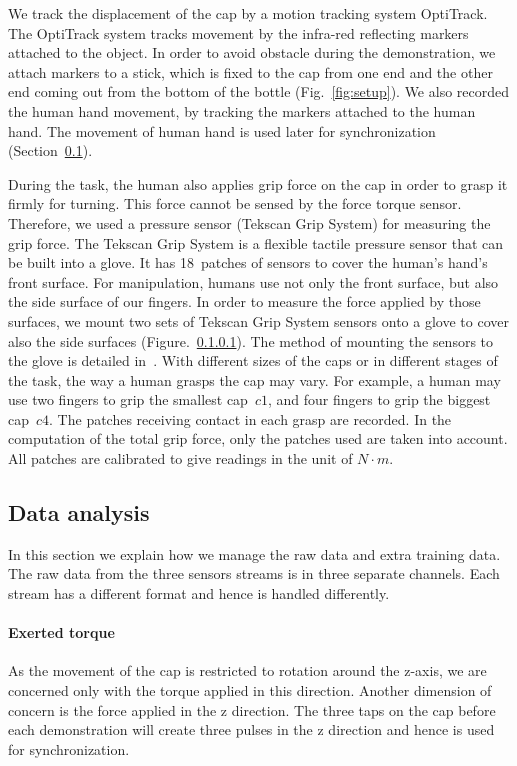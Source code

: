 We track the displacement of the cap by a motion tracking system OptiTrack. The OptiTrack system tracks movement by the infra-red reflecting markers attached to the object. In order to avoid obstacle during the demonstration, we attach markers to a stick, which is fixed to the cap from one end and the other end coming out from the bottom of the bottle (Fig.~\ref{fig:setup}). We also recorded the human hand movement, by tracking the markers attached to the human hand. The movement of human hand is used later for synchronization (Section~\ref{cha4:sec3:dataanalysis}).

During the task, the human also applies grip force on the cap in order
to grasp it firmly for turning. This force cannot be sensed by the
force torque sensor. Therefore, we used a pressure sensor (Tekscan
Grip System) for measuring the grip force. The Tekscan Grip System is
a flexible tactile pressure sensor that can be built into a glove. It
has 18~patches of sensors to cover the human's hand's front
surface. For manipulation, humans use not only the front surface, but
also the side surface of our fingers. In order to measure the force
applied by those surfaces, we mount two sets of Tekscan Grip System
sensors onto a glove to cover also the side surfaces
(Figure.~\ref{ftsensor}). The method of mounting the sensors to the glove
is detailed in~\citep{deSouza2014}. With different sizes of the caps
or in different stages of the task, the way a human grasps the cap may
vary.  For example, a human may use two fingers to grip the smallest
cap~$c1$, and four fingers to grip the biggest cap~$c4$. The patches
receiving contact in each grasp are recorded. In the computation of
the total grip force, only the patches used are taken into
account. All patches are calibrated to give readings in the unit of
$N{\cdot}m$.


\subsection{Data analysis}
\label{cha4:sec3:dataanalysis}
In this section we explain how we manage the raw data and extra
training data.  The raw data from the three sensors streams is in
three separate channels. Each stream has a different format and hence
is handled differently.


\paragraph{\textbf{Exerted torque}}
\label{ftsensor}
As the movement of the cap is restricted to rotation around the
z-axis, we are concerned only with the torque applied in this direction.
Another dimension of concern is the force applied in the z direction. The
three taps on the cap before each demonstration will create three
pulses in the z direction and hence is used for synchronization.


